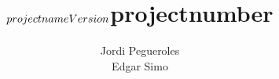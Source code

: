 \documentclass[a4paper]{book}
\begin{document}
\title{ 
\vspace{6cm}
$projectname \\ Version $projectnumber }
\author{Jordi Pegueroles \\ Edgar Simo}
\maketitle

\vspace{4cm}


\newpage

\end{document}
